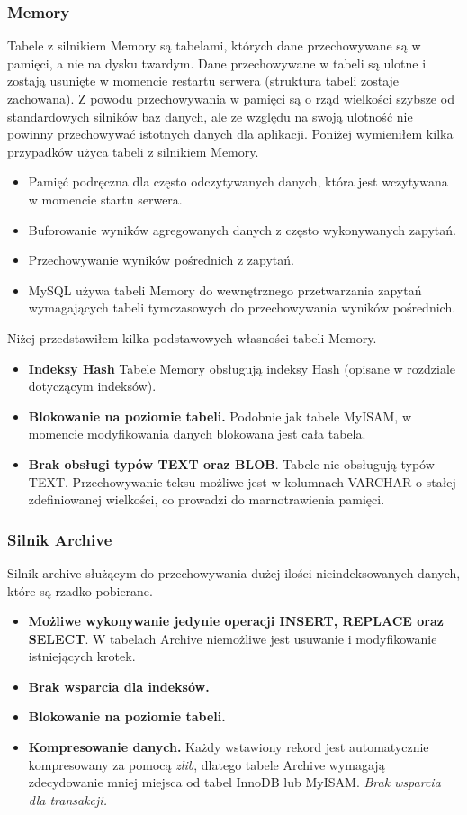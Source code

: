 \subsubsection{Memory}
Tabele z silnikiem Memory są tabelami, których dane przechowywane są w pamięci, a nie na dysku twardym. Dane przechowywane w tabeli są ulotne i zostają usunięte w momencie restartu serwera (struktura tabeli zostaje zachowana). Z powodu przechowywania w pamięci są o rząd wielkości szybsze od standardowych silników baz danych, ale ze względu na swoją ulotność nie powinny przechowywać istotnych danych dla aplikacji. Poniżej wymieniłem kilka przypadków użyca tabeli z silnikiem Memory. 
\begin{itemize}
	\item Pamięć podręczna dla często odczytywanych danych, która jest wczytywana w momencie startu serwera.
	\item Buforowanie wyników agregowanych danych z często wykonywanych zapytań.
	\item Przechowywanie wyników pośrednich z zapytań.
	\item MySQL używa tabeli Memory do wewnętrznego przetwarzania zapytań wymagających tabeli tymczasowych do przechowywania wyników pośrednich.
\end{itemize}
Niżej przedstawiłem kilka podstawowych własności tabeli Memory.
\begin{itemize}
	\item \textbf{Indeksy Hash} Tabele Memory obsługują indeksy Hash (opisane w rozdziale dotyczącym indeksów).
	\item \textbf{Blokowanie na poziomie tabeli.} Podobnie jak tabele MyISAM, w momencie modyfikowania danych blokowana jest cała tabela.
	\item \textbf{Brak obsługi typów TEXT oraz BLOB}. Tabele nie obsługują typów TEXT. Przechowywanie teksu możliwe jest w kolumnach VARCHAR o stałej zdefiniowanej wielkości, co prowadzi do marnotrawienia pamięci.
\end{itemize}


\subsubsection{Silnik Archive}
Silnik archive służącym do przechowywania dużej ilości nieindeksowanych danych, które są rzadko pobierane. 

\begin{itemize}
	\item \textbf{Możliwe wykonywanie jedynie operacji INSERT, REPLACE oraz SELECT}. W tabelach Archive niemożliwe jest usuwanie i modyfikowanie istniejących krotek.
	\item \textbf{Brak wsparcia dla indeksów.}
	\item \textbf{Blokowanie na poziomie tabeli.}
	\item \textbf{Kompresowanie danych.} Każdy wstawiony rekord jest automatycznie kompresowany za pomocą \textit{zlib}, dlatego tabele Archive wymagają zdecydowanie mniej miejsca od tabel InnoDB lub MyISAM.
	\textit{Brak wsparcia dla transakcji.}
\end{itemize}

